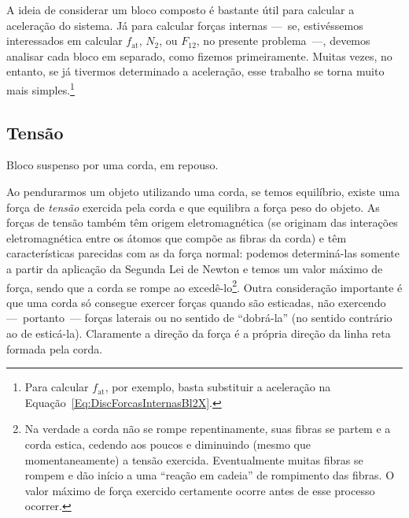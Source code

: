 A ideia de considerar um bloco composto é bastante útil para calcular a aceleração do sistema. Já para calcular forças internas ---~se, estivéssemos interessados em calcular $f_{\text{at}}$, $N_2$, ou $F_{12}$, no presente problema~---, devemos analisar cada bloco em separado, como fizemos primeiramente. Muitas vezes, no entanto, se já tivermos determinado a aceleração, esse trabalho se torna muito mais simples.\footnote[][-5cm]{Para calcular $f_{\text{at}}$, por exemplo, basta substituir a aceleração na Equação~\eqref{Eq:DiscForcasInternasBl2X}.}

\subsection{Tensão} 

\begin{marginfigure}[-2cm]
\centering
{}
\caption{Bloco suspenso por uma corda, em repouso.\label{Fig:Tensao:BlocoSuspenso}}
\end{marginfigure}

Ao pendurarmos um objeto utilizando uma corda, se temos equilíbrio, existe uma força de \emph{tensão} exercida pela corda e que equilibra a força peso do objeto. As forças de tensão também têm origem eletromagnética (se originam das interações eletromagnética entre os átomos que compõe as fibras da corda) e têm características parecidas com as da força normal: podemos determiná-las somente a partir da aplicação da Segunda Lei de Newton e temos um valor máximo de força, sendo que a corda se rompe ao excedê-lo\footnote{Na verdade a corda não se rompe repentinamente, suas fibras se partem e a corda estica, cedendo aos poucos e diminuindo (mesmo que momentaneamente) a tensão exercida. Eventualmente muitas fibras se rompem e dão início a uma ``reação em cadeia'' de rompimento das fibras. O valor máximo de força exercido certamente ocorre antes de esse processo ocorrer.}. Outra consideração importante é que uma corda só consegue exercer forças quando são esticadas, não exercendo ---~portanto~--- forças laterais ou no sentido de ``dobrá-la'' (no sentido contrário ao de esticá-la). Claramente a direção da força é a própria direção da linha reta formada pela corda.


